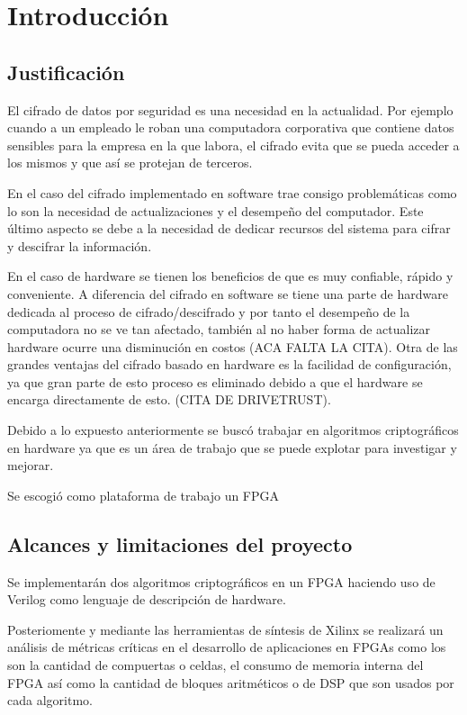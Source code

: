 \chapter{Introducción}

\section{Justificación}
El cifrado de datos por seguridad es una necesidad en la actualidad. Por ejemplo cuando a un empleado le roban una computadora corporativa que contiene datos sensibles para la empresa en la que labora, el cifrado evita que se pueda acceder a los mismos y que así se protejan de terceros.

En el caso del cifrado implementado en software trae consigo problemáticas como lo son la necesidad de actualizaciones y el desempeño del computador. Este último aspecto se debe a la necesidad de dedicar recursos del sistema para cifrar y descifrar la información. 

En el caso de hardware se tienen los beneficios de que es muy confiable, rápido y conveniente. A diferencia del cifrado en software se tiene una parte de hardware dedicada al proceso de cifrado/descifrado y por tanto el desempeño de la computadora no se ve tan afectado, también al no haber forma de actualizar hardware ocurre una disminución en costos (ACA FALTA LA CITA). Otra de las grandes ventajas del cifrado basado en hardware es la facilidad de configuración, ya que gran parte de esto proceso es eliminado debido a que el hardware se encarga directamente de esto. (CITA DE DRIVETRUST).

Debido a lo expuesto anteriormente se buscó trabajar en algoritmos criptográficos en hardware ya que es un área de trabajo que se puede explotar para investigar y mejorar.

Se escogió como plataforma de trabajo un FPGA 


\section{Alcances y limitaciones del proyecto}
Se implementarán dos algoritmos criptográficos en un FPGA haciendo uso de Verilog como lenguaje de descripción de hardware. 

Posteriomente y mediante las herramientas de síntesis de Xilinx se realizará un análisis de métricas críticas en el desarrollo de aplicaciones en FPGAs como los son la cantidad de compuertas o celdas, el consumo de memoria interna del FPGA así como la cantidad de bloques aritméticos o de DSP que son usados por cada algoritmo. 


